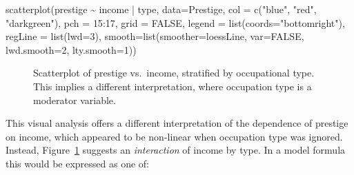 \documentclass[
  letterpaper,
  10pt,
  krantz2]{krantz}
\makeatletter
\newenvironment{Shaded}{\begin{snugshade}}{\end{snugshade}}
\newcommand{\AttributeTok}[1]{\textcolor[rgb]{0.40,0.45,0.13}{#1}}
\newcommand{\ConstantTok}[1]{\textcolor[rgb]{0.56,0.35,0.01}{#1}}
\newcommand{\DecValTok}[1]{\textcolor[rgb]{0.68,0.00,0.00}{#1}}
\newcommand{\FunctionTok}[1]{\textcolor[rgb]{0.28,0.35,0.67}{#1}}
\newcommand{\NormalTok}[1]{\textcolor[rgb]{0.00,0.23,0.31}{#1}}
\newcommand{\SpecialCharTok}[1]{\textcolor[rgb]{0.37,0.37,0.37}{#1}}
\newcommand{\StringTok}[1]{\textcolor[rgb]{0.13,0.47,0.30}{#1}}
\newenvironment{kframe}{%
  \medskip{}
  \setlength{\fboxsep}{.8em}
  \def\at@end@of@kframe{}%
  \ifinner\ifhmode%
  \def\at@end@of@kframe{\end{minipage}}%
  \begin{minipage}{\columnwidth}%
  \fi\fi%
  \def\FrameCommand##1{\hskip\@totalleftmargin \hskip-\fboxsep
  \colorbox{shadecolor}{##1}\hskip-\fboxsep
      \hskip-\linewidth \hskip-\@totalleftmargin \hskip\columnwidth}%
  \MakeFramed {\advance\hsize-\width
    \@totalleftmargin\z@ \linewidth\hsize
    \@setminipage}}%
{\par\unskip\endMakeFramed%
  \at@end@of@kframe}
\renewenvironment{Shaded}{\begin{kframe}}{\end{kframe}}
\makeatother
\begin{document}
\begin{Shaded}
\begin{Highlighting}[]
\FunctionTok{scatterplot}\NormalTok{(prestige }\SpecialCharTok{\textasciitilde{}}\NormalTok{ income }\SpecialCharTok{|}\NormalTok{ type, }\AttributeTok{data=}\NormalTok{Prestige,}
  \AttributeTok{col =} \FunctionTok{c}\NormalTok{(}\StringTok{"blue"}\NormalTok{, }\StringTok{"red"}\NormalTok{, }\StringTok{"darkgreen"}\NormalTok{),}
  \AttributeTok{pch =} \DecValTok{15}\SpecialCharTok{:}\DecValTok{17}\NormalTok{,}
  \AttributeTok{grid =} \ConstantTok{FALSE}\NormalTok{,}
  \AttributeTok{legend =} \FunctionTok{list}\NormalTok{(}\AttributeTok{coords=}\StringTok{"bottomright"}\NormalTok{),}
  \AttributeTok{regLine =} \FunctionTok{list}\NormalTok{(}\AttributeTok{lwd=}\DecValTok{3}\NormalTok{),}
  \AttributeTok{smooth=}\FunctionTok{list}\NormalTok{(}\AttributeTok{smoother=}\NormalTok{loessLine, }
              \AttributeTok{var=}\ConstantTok{FALSE}\NormalTok{, }\AttributeTok{lwd.smooth=}\DecValTok{2}\NormalTok{, }\AttributeTok{lty.smooth=}\DecValTok{1}\NormalTok{))}
\end{Highlighting}
\end{Shaded}

\begin{figure}[H]


\caption{\label{fig-Prestige-scatterplot3}Scatterplot of prestige
vs.~income, stratified by occupational type. This implies a different
interpretation, where occupation type is a moderator variable.}

\end{figure}%

This visual analysis offers a different interpretation of the dependence
of prestige on income, which appeared to be non-linear when occupation
type was ignored. Instead, Figure~\ref{fig-Prestige-scatterplot3}
suggests an \emph{interaction} of income by type. In a model formula
this would be expressed as one of:
\end{document}
